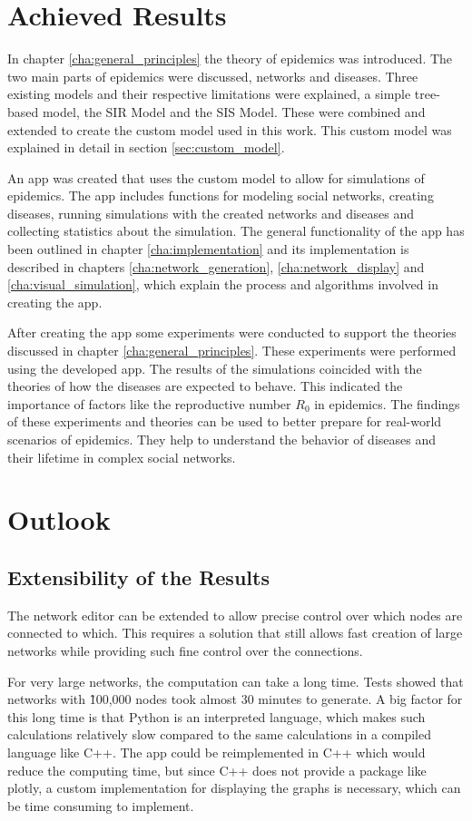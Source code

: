 \section{Achieved Results}
In chapter \ref{cha:general_principles} the theory of epidemics was introduced. The two main parts of epidemics were discussed, networks and diseases. Three existing models and their respective limitations were explained, a simple tree-based model, the SIR Model and the SIS Model. These were  combined and extended to create the custom model used in this work. This custom model was explained in detail in section \ref{sec:custom_model}.

An app was created that uses the custom model to allow for simulations of epidemics. The app includes functions for modeling social networks, creating diseases, running simulations with the created networks and diseases and collecting statistics about the simulation. The general functionality of the app has been outlined in chapter \ref{cha:implementation} and its implementation is described in chapters \ref{cha:network_generation}, \ref{cha:network_display} and \ref{cha:visual_simulation}, which explain the process and algorithms involved in creating the app.

After creating the app some experiments were conducted to support the theories discussed in chapter \ref{cha:general_principles}. These experiments were performed using the developed app. The results of the simulations coincided with the theories of how the diseases are expected to behave. This indicated the importance of factors like the reproductive number $R_0$ in epidemics. The findings of these experiments and theories can be used to better prepare for real-world scenarios of epidemics. They help to understand the behavior of diseases and their lifetime in complex social networks.

\section{Outlook}
\subsection{Extensibility of the Results}
The network editor can be extended to allow precise control over which nodes are connected to which. This requires a solution that still allows fast creation of large networks while providing such fine control over the connections.

For very large networks, the computation can take a long time. Tests showed that networks with \~100,000 nodes took almost 30 minutes to generate. A big factor for this long time is that Python is an interpreted language, which makes such calculations relatively slow compared to the same calculations in a compiled language like C++. The app could be reimplemented in C++ which would reduce the computing time, but since C++ does not provide a package like plotly, a custom implementation for displaying the graphs is necessary, which can be time consuming to implement.

